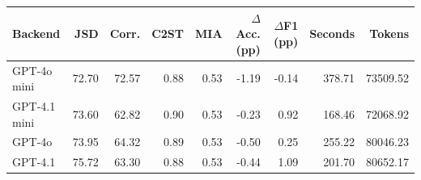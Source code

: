 \begin{tabular}{lrrrrrrrr}
\toprule
Backend & JSD & Corr. & C2ST & MIA & $\Delta$Acc. (pp) & $\Delta$F1 (pp) & Seconds & Tokens \\
\midrule
GPT-4o mini & 72.70 & 72.57 & 0.88 & 0.53 & -1.19 & -0.14 & 378.71 & 73509.52 \\
GPT-4.1 mini & 73.60 & 62.82 & 0.90 & 0.53 & -0.23 & 0.92 & 168.46 & 72068.92 \\
GPT-4o & 73.95 & 64.32 & 0.89 & 0.53 & -0.50 & 0.25 & 255.22 & 80046.23 \\
GPT-4.1 & 75.72 & 63.30 & 0.88 & 0.53 & -0.44 & 1.09 & 201.70 & 80652.17 \\
\bottomrule
\end{tabular}
